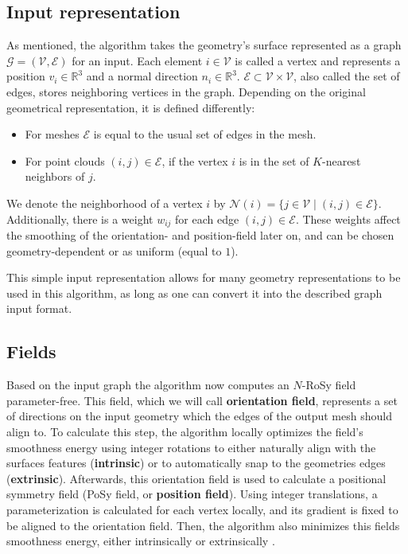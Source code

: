 \documentclass{ACGSeminar}
\begin{document}
\subsection{Input representation}
As mentioned, the algorithm takes the geometry's surface represented as a graph $\mathcal{G} = (\mathcal{V}, \mathcal{E})$ for an input. Each element $i \in \mathcal{V}$ is called a vertex and represents a position $v_i \in \mathbb{R}^3$ and a normal direction $n_i \in \mathbb{R}^3$. $\mathcal{E} \subset \mathcal{V} \times \mathcal{V}$, also called the set of edges, stores neighboring vertices in the graph. Depending on the original geometrical representation, it is defined differently:
\begin{itemize}
	\item	For meshes $\mathcal{E}$ is equal to the usual set of edges in the mesh.
	\item	For point clouds $(i,j) \in \mathcal{E}$, if the vertex $i$ is in the set of $K$-nearest neighbors of $j$.
\end{itemize}
We denote the neighborhood of a vertex $i$ by $\mathcal{N}(i) = \{j \in \mathcal{V} \mid (i,j) \in \mathcal{E}\}$. Additionally, there is a weight $w_{ij}$ for each edge $(i,j) \in \mathcal{E}$. These weights affect the smoothing of the orientation- and position-field later on, and can be chosen geometry-dependent or as uniform (equal to $1$).\bigskip

This simple input representation allows for many geometry representations to be used in this algorithm, as long as one can convert it into the described graph input format.

\subsection{Fields}
Based on the input graph the algorithm now computes an $N$-RoSy field parameter-free. This field, which we will call \textbf{orientation field}, represents a set of directions on the input geometry which the edges of the output mesh should align to. To calculate this step, the algorithm locally optimizes the field's smoothness energy using integer rotations to either naturally align with the surfaces features (\textbf{intrinsic}) or to automatically snap to the geometries edges (\textbf{extrinsic}). Afterwards, this orientation field is used to calculate a positional symmetry field (PoSy field, or \textbf{position field}). Using integer translations, a parameterization is calculated for each vertex locally, and its gradient is fixed to be aligned to the orientation field. Then, the algorithm also minimizes this fields smoothness energy, either intrinsically or extrinsically \cite{jakob2015instant}.\bigskip
\end{document}
